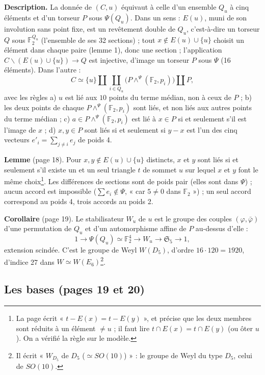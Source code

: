\documentclass[11pt,a4paper]{article}
\begin{document}
\textbf{Description.} La donnée de $(C, u)$ équivaut à celle d'un ensemble
$Q_u$ à cinq éléments et d'un torseur $P$ sous $\Psi(Q_u)$. Dans un sens :
$E(u)$, muni de son involution sans point fixe, est un revêtement double de
$Q_u$, c'est-à-dire un torseur $Q$ sous $\mathbb{F}_2^{Q_u}$ (l'ensemble de ses
32 sections) ; tout $x \notin E(u) \cup \lbrace u\rbrace$ choisit un élément
dans chaque paire (lemme 1), donc une section ; l'application $C
\smallsetminus (E(u) \cup \lbrace u\rbrace) \to Q$ est injective, d'image un
torseur $P$ sous $\Psi$ (16 éléments). Dans l'autre :
\[
C \simeq \lbrace u\rbrace \amalg \coprod_{i \in Q_u} \bigl(P \wedge^{\Psi}
(\mathbb{F}_2, p_i)\bigr) \amalg P ,
\]
avec les règles a) $u$ est lié aux $10$ points du terme médian, non à ceux de
$P$ ; b) les deux points de chaque $P \wedge^\Psi (\mathbb{F}_2, p_i)$ sont
liés, et non liés aux autres points du terme médian ; c) $a \in P \wedge^\Psi
(\mathbb{F}_2, p_i)$ est lié à $x \in P$ si et seulement s'il est l'image de
$x$ ; d) $x, y \in P$ sont liés si et seulement si $y - x$ est l'un des cinq
vecteurs $e'_i = \sum_{j \neq i} e_j$ de poids 4.

\textbf{Lemme} (page 18). Pour $x, y \notin E(u) \cup \lbrace u\rbrace$
distincts, $x$ et $y$ sont liés si et seulement s'il existe un et un seul
triangle $t$ de sommet $u$ sur lequel $x$ et $y$ font le même
choix\footnote{La page écrit « $t - E(x) = t - E(y)$ », et précise que les
deux membres sont réduits à un élément $\neq u$ ; il faut lire $t \cap E(x) =
t \cap E(y)$ (ou ôter $u$). On a vérifié la règle sur le modèle.}. Les
différences de sections sont de poids pair (elles sont dans $\Psi$) ; aucun
accord est impossible ($\sum e_i \notin \Psi$, « car $5 \neq 0$ dans
$\mathbb{F}_2$ ») ; un seul accord correspond au poids 4, trois accords au
poids 2.

\textbf{Corollaire} (page 19). Le stabilisateur $W_u$ de $u$ est le groupe des
couples $(\varphi, \bar\varphi)$ d'une permutation de $Q_u$ et d'un
automorphisme affine de $P$ au-dessus d'elle :
\[
1 \to \Psi(Q_u) \simeq \mathbb{F}_2^4 \to W_u \to \mathfrak{S}_5 \to 1 ,
\]
extension scindée. C'est le groupe de Weyl $W(D_5)$, d'ordre $16 \cdot 120 =
1920$, d'indice 27 dans $W \simeq W(E_6)$\footnote{Il écrit « $W_{D_5}$ de
$D_5$ ($\simeq SO(10)$) » : le groupe de Weyl du type $D_5$, celui de
$SO(10)$.}.

\subsection*{Les bases (pages 19 et 20)}
\end{document}
